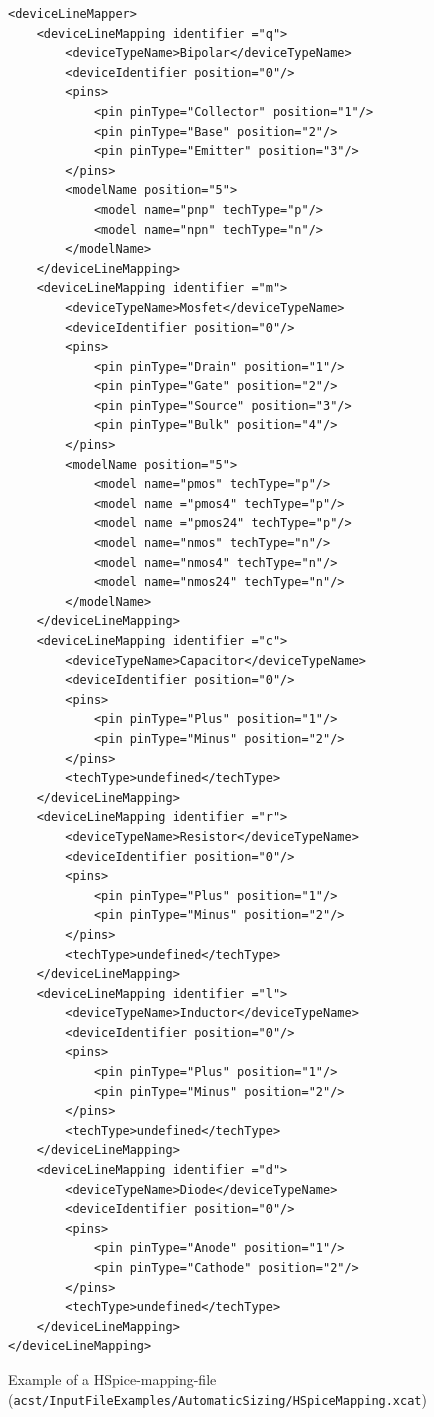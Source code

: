 \begin{figure}[H]
	\begin{lstlisting}[basicstyle=\ttfamily\scriptsize,backgroundcolor={\color{gray!30}}, escapechar=? ]
<deviceLineMapper>
	<deviceLineMapping identifier ="q">
		<deviceTypeName>Bipolar</deviceTypeName>
		<deviceIdentifier position="0"/>
		<pins>
			<pin pinType="Collector" position="1"/>
			<pin pinType="Base" position="2"/>
			<pin pinType="Emitter" position="3"/>
		</pins>
		<modelName position="5">
			<model name="pnp" techType="p"/>
			<model name="npn" techType="n"/>
		</modelName>    
	</deviceLineMapping>
	<deviceLineMapping identifier ="m">
		<deviceTypeName>Mosfet</deviceTypeName>
		<deviceIdentifier position="0"/>
		<pins>
			<pin pinType="Drain" position="1"/>
			<pin pinType="Gate" position="2"/>
			<pin pinType="Source" position="3"/>
			<pin pinType="Bulk" position="4"/>
		</pins>
		<modelName position="5">
			<model name="pmos" techType="p"/>
			<model name ="pmos4" techType="p"/>
			<model name ="pmos24" techType="p"/>
			<model name="nmos" techType="n"/>
			<model name="nmos4" techType="n"/>
			<model name="nmos24" techType="n"/>
		</modelName>    
	</deviceLineMapping>
	<deviceLineMapping identifier ="c">
		<deviceTypeName>Capacitor</deviceTypeName>
		<deviceIdentifier position="0"/>
		<pins>
			<pin pinType="Plus" position="1"/>
			<pin pinType="Minus" position="2"/>
		</pins>
		<techType>undefined</techType>   
	</deviceLineMapping>
	<deviceLineMapping identifier ="r">
		<deviceTypeName>Resistor</deviceTypeName>
		<deviceIdentifier position="0"/>
		<pins>
			<pin pinType="Plus" position="1"/>
			<pin pinType="Minus" position="2"/>
		</pins>
		<techType>undefined</techType>   
	</deviceLineMapping>
	<deviceLineMapping identifier ="l">
		<deviceTypeName>Inductor</deviceTypeName>
		<deviceIdentifier position="0"/>
		<pins>
			<pin pinType="Plus" position="1"/>
			<pin pinType="Minus" position="2"/>
		</pins>
		<techType>undefined</techType>   
	</deviceLineMapping>
	<deviceLineMapping identifier ="d">
		<deviceTypeName>Diode</deviceTypeName>
		<deviceIdentifier position="0"/>
		<pins>
			<pin pinType="Anode" position="1"/>
			<pin pinType="Cathode" position="2"/>
		</pins>
		<techType>undefined</techType>   
	</deviceLineMapping>
</deviceLineMapping>
\end{lstlisting}
\caption{Example of a HSpice-mapping-file ({\tt acst/InputFileExamples/Automatic\protect \linebreak Sizing/HSpiceMapping.xcat})}
\end{figure}

